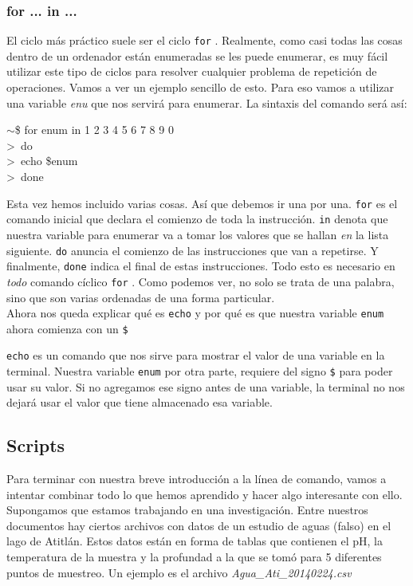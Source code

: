 \documentclass[10pt,letterpaper]{article}
\newcommand{\inlinecode}[1]{
\colorbox{light-gray}{\texttt{#1}}
}
\newenvironment{Code}
{
\begin{lrbox}{\selvestebox}%
\begin{minipage}{\dimexpr\columnwidth-2\fboxsep\relax}
\fontfamily{\ttdefault}\selectfont
}
{\end{minipage}\end{lrbox}%
\begin{center}
\colorbox{light-gray}{\usebox{\selvestebox}}
\end{center}
}
\begin{document}
\subsubsection{for ... in ...}
El ciclo m\'as pr\'actico suele ser el ciclo \inlinecode{for}. Realmente, como casi todas las cosas dentro de un ordenador est\'an enumeradas se les puede enumerar, es muy f\'acil utilizar este tipo de ciclos para resolver cualquier problema de repetici\'on de operaciones. Vamos a ver un ejemplo sencillo de esto. Para eso vamos a utilizar una variable \emph{enu} que nos servir\'a para enumerar. La sintaxis del comando ser\'a as\'i:
\begin{Code}
$\sim$\$ for enum in 1 2 3 4 5 6 7 8 9 0\\
>\ do\\
>\ echo \$enum\\
>\ done
\end{Code}

Esta vez hemos incluido varias cosas. As\'i que debemos ir una por una. \inlinecode{for} es el comando inicial que declara el comienzo de toda la instrucci\'on. \inlinecode{in} denota que nuestra variable para enumerar va a tomar los valores que se hallan \emph{en} la lista siguiente. \inlinecode{do} anuncia el comienzo de las instrucciones que van a repetirse. Y finalmente, \inlinecode{done} indica el final de estas instrucciones. Todo esto es necesario en \emph{todo} comando c\'iclico \inlinecode{for}. Como podemos ver, no solo se trata de una palabra, sino que son varias ordenadas de una forma particular.\\

Ahora nos queda explicar qu\'e es \inlinecode{echo} y por qu\'e es que nuestra variable \inlinecode{enum} ahora comienza con un \inlinecode{\$} \inlinecode{echo} es un comando que nos sirve para mostrar el valor de una variable en la terminal. Nuestra variable \inlinecode{enum} por otra parte, requiere del signo \inlinecode{\$} para poder usar su valor. Si no agregamos ese signo antes de una variable, la terminal no nos dejar\'a usar el valor que tiene almacenado esa variable.

\subsection{Scripts}
Para terminar con nuestra breve introducci\'on a la l\'inea de comando, vamos a intentar combinar todo lo que hemos aprendido y hacer algo interesante con ello. Supongamos que estamos trabajando en una investigaci\'on. Entre nuestros documentos hay ciertos archivos con datos de un estudio de aguas (falso) en el lago de Atitl\'an. Estos datos est\'an en forma de tablas que contienen el pH, la temperatura de la muestra y la profundad a la que se tom\'o para 5 diferentes puntos de muestreo. Un ejemplo es el archivo \emph{Agua\_Ati\_20140224.csv}\\
\end{document}
